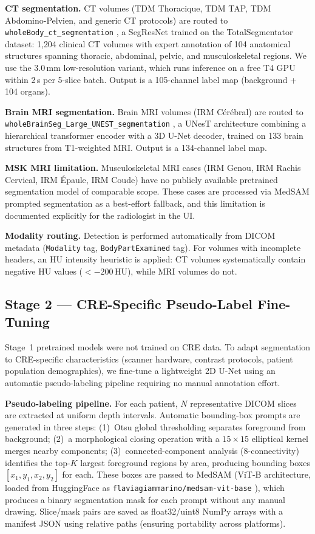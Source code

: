 \documentclass[conference]{IEEEtran}
\begin{document}
\textbf{CT segmentation.}
CT volumes (TDM Thoracique, TDM TAP, TDM Abdomino-Pelvien, and generic CT
protocols) are routed to \texttt{wholeBody\_ct\_segmentation} \cite{wasserthal2023},
a SegResNet trained on the TotalSegmentator dataset: 1{,}204 clinical CT
volumes with expert annotation of 104 anatomical structures spanning thoracic,
abdominal, pelvic, and musculoskeletal regions. We use the 3.0\,mm
low-resolution variant, which runs inference on a free T4 GPU within 2\,s per
5-slice batch. Output is a 105-channel label map (background + 104 organs).

\textbf{Brain MRI segmentation.}
Brain MRI volumes (IRM C\'{e}r\'{e}bral) are routed to
\texttt{wholeBrainSeg\_Large\_UNEST\_segmentation} \cite{yu2023}, a UNesT
architecture combining a hierarchical transformer encoder with a 3D U-Net
decoder, trained on 133 brain structures from T1-weighted MRI. Output is a
134-channel label map.

\textbf{MSK MRI limitation.}
Musculoskeletal MRI cases (IRM Genou, IRM Rachis Cervical, IRM \'{E}paule,
IRM Coude) have no publicly available pretrained segmentation model of
comparable scope. These cases are processed via MedSAM prompted segmentation
as a best-effort fallback, and this limitation is documented explicitly for
the radiologist in the UI.

\textbf{Modality routing.}
Detection is performed automatically from DICOM metadata (\texttt{Modality}
tag, \texttt{BodyPartExamined} tag). For volumes with incomplete headers, an
HU intensity heuristic is applied: CT volumes systematically contain negative
HU values ($<-200$\,HU), while MRI volumes do not.

\subsection{Stage 2 --- CRE-Specific Pseudo-Label Fine-Tuning}

Stage~1 pretrained models were not trained on CRE data. To adapt segmentation
to CRE-specific characteristics (scanner hardware, contrast protocols, patient
population demographics), we fine-tune a lightweight 2D U-Net using an
automatic pseudo-labeling pipeline requiring no manual annotation effort.

\textbf{Pseudo-labeling pipeline.}
For each patient, $N$ representative DICOM slices are extracted at uniform
depth intervals. Automatic bounding-box prompts are generated in three steps:
(1)~Otsu global thresholding separates foreground from background; (2)~a
morphological closing operation with a $15\!\times\!15$ elliptical kernel
merges nearby components; (3)~connected-component analysis (8-connectivity)
identifies the top-$K$ largest foreground regions by area, producing bounding
boxes $[x_1, y_1, x_2, y_2]$ for each. These boxes are passed to MedSAM
(ViT-B architecture, loaded from HuggingFace as
\texttt{flaviagiammarino/medsam-vit-base} \cite{ma2024}), which produces a
binary segmentation mask for each prompt without any manual drawing.
Slice/mask pairs are saved as float32/uint8 NumPy arrays with a manifest JSON
using relative paths (ensuring portability across platforms).
\end{document}
